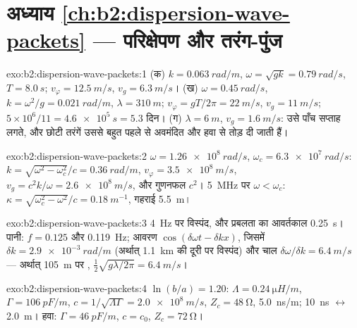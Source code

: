 \section*{अध्याय \ref{ch:b2:dispersion-wave-packets} --- परिक्षेपण और तरंग-पुंज}

\begin{solution}{exo:b2:dispersion-wave-packets:1}
(क) $k = \qty{0.063}{rad/m}$, $\omega = \sqrt{gk} = \qty{0.79}{rad/s}$, $T = \qty{8.0}{s}$;
$v_\varphi = \qty{12.5}{m/s}$, $v_g = \qty{6.3}{m/s}$। (ख) $\omega = \qty{0.45}{rad/s}$, $k = \omega^2
/g = \qty{0.021}{rad/m}$, $\lambda = \qty{310}{m}$; $v_\varphi = gT/2\pi = \qty{22}{m/s}$, $v_g =
\qty{11}{m/s}$; $5 \times 10^6/11 = \qty{4.6e5}{s} = 5.3$ दिन। (ग) $\lambda = \qty{6}{m}$, $v_g
= \qty{1.6}{m/s}$: उसे पाँच सप्ताह लगते, और छोटी तरंगें उससे बहुत पहले
 से अवमंदित और हवा से तोड़ दी जाती हैं।
\end{solution}

\begin{solution}{exo:b2:dispersion-wave-packets:2}
$\omega = \qty{1.26e8}{rad/s}$, $\omega_c = \qty{6.3e7}{rad/s}$: $k = \sqrt{\omega^2 - \omega_c^2}/c =
\qty{0.36}{rad/m}$, $v_\varphi = \qty{3.5e8}{m/s}$, $v_g = c^2k/\omega = \qty{2.6e8}{m/s}$,
और गुणनफल $c^2$। \qty{5}{MHz} पर $\omega < \omega_c$: $\kappa = \sqrt{\omega_c^2 - \omega^2}/c =
\qty{0.18}{m^{-1}}$, गहराई \qty{5.5}{m}।
\end{solution}

\begin{solution}{exo:b2:dispersion-wave-packets:3}
\qty{4}{Hz} पर विस्पंद, और प्रबलता का आवर्तकाल \qty{0.25}{s}। पानी: $f = 0.125$ और
\qty{0.119}{Hz}; आवरण $\cos(\delta\omega t - \delta kx)$, जिसमें $\delta k = \qty{2.9e-3}{rad/m}$
(अर्थात् \qty{1.1}{km} की दूरी पर विस्पंद) और चाल $\delta\omega/\delta k = \qty{6.4}{m/s}$ ---
अर्थात् \qty{105}{m} पर , $\tfrac12\sqrt{g\lambda/2\pi} = \qty{6.4}{m/s}$।
\end{solution}

\begin{solution}{exo:b2:dispersion-wave-packets:4}
$\ln(b/a) = 1.20$: $\Lambda = \qty{0.24}{\micro H/m}$, $\Gamma = \qty{106}{pF/m}$, $c = 1/
\sqrt{\Lambda\Gamma} = \qty{2.0e8}{m/s}$, $Z_c = \qty{48}{\ohm}$, \qty{5.0}{ns/m}; \qty{10}{ns}
$\leftrightarrow$ \qty{2.0}{m}। हवा: $\Gamma = \qty{46}{pF/m}$, $c = c_0$, $Z_c = \qty{72}{\ohm}$।
\end{solution}

